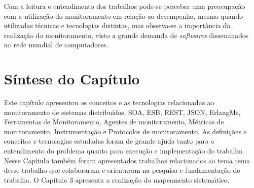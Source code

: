 Com a leitura e entendimento dos trabalhos pode-se perceber uma preocupação com a utilização do monitoramento em relação ao desempenho, mesmo quando utilizadas técnicas e tecnologias distintas, mas observa-se a importância da realização do monitoramento, visto a grande demanda de \textit{softwares} disseminados na rede mundial de computadores.


\section{Síntese do Capítulo}

Este capítulo apresentou os conceitos e as tecnologias relacionadas ao monitoramento de sistemas distribuídos, \acrshort{SOA}, \acrshort{ESB},  \acrshort{REST}, \acrshort{JSON}, ErlangMs, Ferramentas de Monitoramento, Agentes de monitoramento, Métricas de monitoramento, Instrumentação e Protocolos de monitoramento. As definições e conceitos e tecnologias estudadas foram de grande ajuda tanto para o entendimento do problema quanto para execução e implementação do trabalho. Nesse Capítulo também foram apresentados trabalhos relacionados ao tema tema desse trabalho que colaboraram e orientaram na pesquisa e fundamentação do trabalho. O Capítulo 3 apresenta a realização do mapeamento sistemático.

